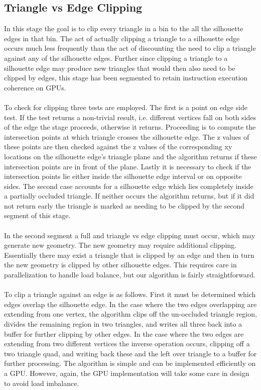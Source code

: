 \documentclass[review]{acmsiggraph}
\begin{document}
\subsection{Triangle vs Edge Clipping}
	In this stage the goal is to clip every triangle in a bin to the all the silhouette edges in that bin. The act of actually clipping a triangle to a silhouette edge occurs much less frequently than the act of discounting the need to clip a triangle against any of the silhouette edges. Further since clipping a triangle to a silhouette edge may produce new triangles that would then also need to be clipped by edges, this stage has been segmented to retain instruction execution coherence on GPUs.
\\\\
To check for clipping three tests are employed. The first is a point on edge side test. If the test returns a non-trivial result, i.e. different vertices fall on both sides of the edge the stage proceeds, otherwise it returns. Proceeding is to compute the intersection points at which triangle crosses the silhouette edge. The z values of these points are then checked against the z values of the corresponding xy locations on the silhouette edge’s triangle plane and the algorithm returns if these intersection points are in front of the plane. Lastly it is necessary to check if the intersection points lie either inside the silhouette edge interval or on opposite sides. The second case accounts for a silhouette edge which lies completely inside a partially occluded triangle. If neither occurs the algorithm returns, but if it did not return early the triangle is marked as needing to be clipped by the second segment of this stage.
	\\\\
In the second segment a full and triangle vs edge clipping must occur, which may generate new geometry. The new geometry may require additional clipping. Essentially there may exist a triangle that is clipped by an edge and then in turn the new geometry is clipped by other silhouette edges. This requires care in parallelization to handle load balance, but our algorithm is fairly straightforward.
\\\\
To clip a triangle against an edge is as follows. First it must be determined which edges overlap the silhouette edge. In the case where the two edges overlapping are extending from one vertex, the algorithm clips off the un-occluded triangle region, divides the remaining region in two triangles, and writes all three back into a buffer for further clipping by other edges. In the case where the two edges are extending from two different vertices the inverse operation occurs, clipping off a two triangle quad, and writing back these and the left over triangle to a buffer for further processing. The algorithm is simple and can be implemented efficiently on a GPU. However, again, the GPU implementation will take some care in design to avoid load imbalance.
\end{document}
